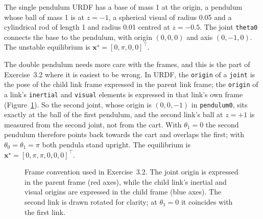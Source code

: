 \documentclass[11pt]{report}
\newcommand{\bx}{\mathbf{x}}
\begin{document}
The single pendulum URDF has a base of mass 1 at the origin, a pendulum whose
ball of mass 1 is at $z=-1$, a spherical visual of radius 0.05 and a
cylindrical rod of length 1 and radius 0.01 centred at $z=-0.5$.  The joint
\texttt{theta0} connects the base to the pendulum, with origin $(0,0,0)$ and
axis $(0,-1,0)$.  The unstable equilibrium is $\bx^\star=[0,\pi,0,0]^\top$.

The double pendulum needs more care with the frames, and this is the part of
Exercise~3.2 where it is easiest to be wrong.  In URDF, the \texttt{origin} of
a \texttt{joint} is the pose of the child link frame expressed in the parent
link frame; the \texttt{origin} of a link's \texttt{inertial} and
\texttt{visual} elements is expressed in that link's own frame
(Figure~\ref{fig:urdf-frames}).  So the second joint, whose origin is
$(0,0,-1)$ in \texttt{pendulum0}, sits exactly at the ball of the first
pendulum, and the second link's ball at $z=+1$ is measured from the second
joint, not from the cart.  With $\theta_1=0$ the second pendulum therefore
points back towards the cart and overlaps the first; with
$\theta_0=\theta_1=\pi$ both pendula stand upright.  The equilibrium is
$\bx^\star=[0,\pi,\pi,0,0,0]^\top$.

\begin{figure}[htbp]
\centering
{}
\caption{Frame convention used in Exercise~3.2.  The joint origin is expressed
in the parent frame (red axes), while the child link's inertial and visual
origins are expressed in the child frame (blue axes).  The second link is drawn
rotated for clarity; at $\theta_1=0$ it coincides with the first link.}
\label{fig:urdf-frames}
\end{figure}
\end{document}
